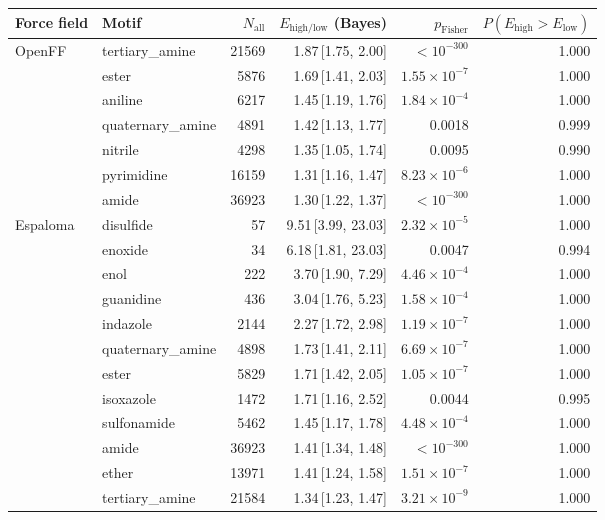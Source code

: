 \begin{table}[t]
  \centering
  \small
  \setlength{\tabcolsep}{6pt}
  \renewcommand{\arraystretch}{1.15}
  \begin{tabular}{llrrrr}
    \hline
    Force field & Motif & $N_\mathrm{all}$ & $E_{\mathrm{high/low}}$ (Bayes) & $p_\mathrm{Fisher}$ & $P(E_{\mathrm{high}}>E_{\mathrm{low}})$ \\
    \hline
    OpenFF & tertiary\_amine & 21569 & 1.87\,[1.75, 2.00] & $< 10^{-300}$ & 1.000 \\
      & ester & 5876 & 1.69\,[1.41, 2.03] & $1.55\times 10^{-7}$ & 1.000 \\
      & aniline & 6217 & 1.45\,[1.19, 1.76] & $1.84\times 10^{-4}$ & 1.000 \\
      & quaternary\_amine & 4891 & 1.42\,[1.13, 1.77] & 0.0018 & 0.999 \\
      & nitrile & 4298 & 1.35\,[1.05, 1.74] & 0.0095 & 0.990 \\
      & pyrimidine & 16159 & 1.31\,[1.16, 1.47] & $8.23\times 10^{-6}$ & 1.000 \\
      & amide & 36923 & 1.30\,[1.22, 1.37] & $< 10^{-300}$ & 1.000 \\
    \hline
    Espaloma & disulfide & 57 & 9.51\,[3.99, 23.03] & $2.32\times 10^{-5}$ & 1.000 \\
      & enoxide & 34 & 6.18\,[1.81, 23.03] & 0.0047 & 0.994 \\
      & enol & 222 & 3.70\,[1.90, 7.29] & $4.46\times 10^{-4}$ & 1.000 \\
      & guanidine & 436 & 3.04\,[1.76, 5.23] & $1.58\times 10^{-4}$ & 1.000 \\
      & indazole & 2144 & 2.27\,[1.72, 2.98] & $1.19\times 10^{-7}$ & 1.000 \\
      & quaternary\_amine & 4898 & 1.73\,[1.41, 2.11] & $6.69\times 10^{-7}$ & 1.000 \\
      & ester & 5829 & 1.71\,[1.42, 2.05] & $1.05\times 10^{-7}$ & 1.000 \\
      & isoxazole & 1472 & 1.71\,[1.16, 2.52] & 0.0044 & 0.995 \\
      & sulfonamide & 5462 & 1.45\,[1.17, 1.78] & $4.48\times 10^{-4}$ & 1.000 \\
      & amide & 36923 & 1.41\,[1.34, 1.48] & $< 10^{-300}$ & 1.000 \\
      & ether & 13971 & 1.41\,[1.24, 1.58] & $1.51\times 10^{-7}$ & 1.000 \\
      & tertiary\_amine & 21584 & 1.34\,[1.23, 1.47] & $3.21\times 10^{-9}$ & 1.000 \\

\end{tabular}
\end{table}
